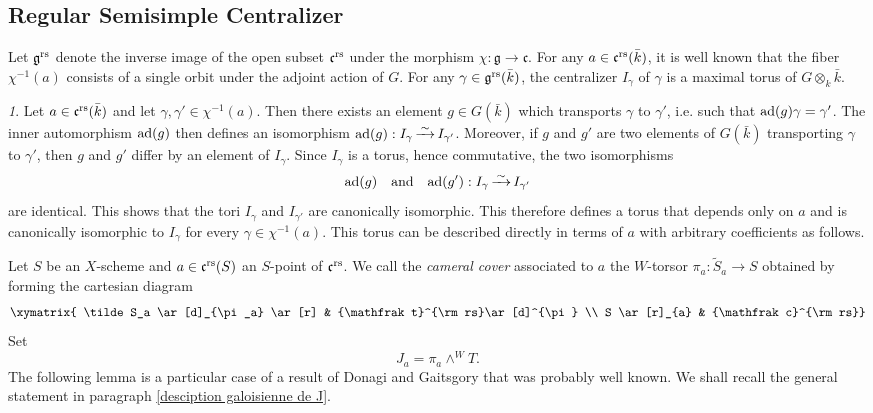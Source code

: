 \documentclass[12pt,english]{smfart}
\numberwithin{equation}{subsection}
\theoremstyle{remark}
\newtheorem{numero}[equation]{}
\newcommand\frakg{{\mathfrak g}}
\newcommand\frakt{{\mathfrak t}}
\newcommand\frakc{{\mathfrak c}}
\newcommand\ad{{\rm ad}}
\newcommand\isom{\,\smash{\mathop{\hbox to 5mm{\rightarrowfill}}
    \limits^\sim}\,}
\newcommand\rs{{\rm rs}}
\begin{document}
\subsection{Regular Semisimple Centralizer}\label{subsection : Centralisateur rs}

Let $\frakg^\rs$ denote the inverse image of the open subset $\frakc^\rs$ under the morphism $\chi:\frakg\rightarrow\frakc$. For any $a\in\frakc^\rs(\bar k)$, it is well known that the fiber $\chi^{-1}(a)$ consists of a single orbit under the adjoint action of $G$. For any $\gamma\in \frakg^\rs(\bar k)$, the centralizer $I_\gamma$ of $\gamma$ is a maximal torus of $G\otimes_k \bar k$.

\begin{numero}
Let $a\in \frakc^\rs(\bar k)$ and let $\gamma,\gamma'\in \chi^{-1}(a)$. Then there exists an element $g\in G(\bar k)$ which transports $\gamma$ to $\gamma'$, i.e. such that $\ad(g)\gamma=\gamma'$. The inner automorphism $\ad(g)$ then defines an isomorphism $\ad(g):I_\gamma \isom I_{\gamma'}$. Moreover, if $g$ and $g'$ are two elements of $G(\bar k)$ transporting $\gamma$ to $\gamma'$, then $g$ and $g'$ differ by an element of $I_\gamma$. Since $I_\gamma$ is a torus, hence commutative, the two isomorphisms
$$\ad(g)\quad \text{and}\quad \ad(g'):I_\gamma \isom I_{\gamma'}$$
are identical. This shows that the tori $I_\gamma$ and $I_{\gamma'}$ are canonically isomorphic. This therefore defines a torus that depends only on $a$ and is canonically isomorphic to $I_\gamma$ for every $\gamma\in\chi^{-1}(a)$. This torus can be described directly in terms of $a$ with arbitrary coefficients as follows.

Let $S$ be an $X$-scheme and $a\in\frakc^\rs(S)$ an $S$-point of $\frakc^\rs$. We call the {\em cameral cover} associated to $a$ the $W$-torsor $\pi_a:\tilde S_a \rightarrow S$ obtained by forming the cartesian diagram
$$
\xymatrix{
 \tilde S_a \ar[d]_{\pi_a} \ar[r]   & \frakt^\rs \ar[d]^{\pi}   \\
  S \ar[r]_{a} & \frakc^\rs           }
$$
Set
\begin{equation}\label{pi a J a}
J_a=\pi_a\wedge^{W} T.
\end{equation}
The following lemma is a particular case of a result of Donagi and Gaitsgory that was probably well known. We shall recall the general statement in paragraph \ref{desciption galoisienne de J}.
\end{numero}
\end{document}
